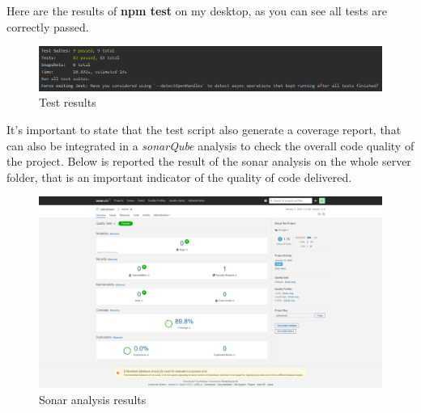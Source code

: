Here are the results of \textbf{npm test} on my desktop, as you can see all tests are correctly passed.
\bigskip
\begin{figure}[H]
	\centering
	\includegraphics[width=1\linewidth]{Images/serverTests}
	\caption{Test results}
	\label{fig:tests}
\end{figure}


It's important to state that the test script also generate a coverage report, that can also be integrated in a \textit{sonarQube} analysis to check the overall code quality of the project. Below is reported the result of the sonar analysis on the whole server folder, that is an important indicator of the quality of code delivered.

\bigskip
\begin{figure}[H]
	\centering
	\includegraphics[width=1\linewidth]{Images/sonarReport}
	\caption{Sonar analysis results}
	\label{fig:sonarreport}
\end{figure}
